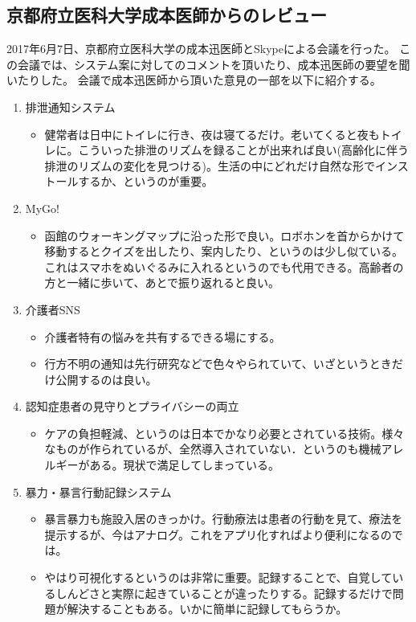 \documentclass[../report]{subfiles}
\begin{document}
\subsection{京都府立医科大学成本医師からのレビュー}
2017年6月7日、京都府立医科大学の成本迅医師とSkypeによる会議を行った。
この会議では、システム案に対してのコメントを頂いたり、成本迅医師の要望を聞いたりした。
会議で成本迅医師から頂いた意見の一部を以下に紹介する。
\begin{enumerate}
    \item 排泄通知システム
        \begin{itemize}
            \item 健常者は日中にトイレに行き、夜は寝てるだけ。老いてくると夜もトイレに。こういった排泄のリズムを録ることが出来れば良い(高齢化に伴う排泄のリズムの変化を見つける)。生活の中にどれだけ自然な形でインストールするか、というのが重要。
        \end{itemize}
    \item MyGo!
        \begin{itemize}
            \item 函館のウォーキングマップに沿った形で良い。ロボホンを首からかけて移動するとクイズを出したり、案内したり、というのは少し似ている。これはスマホをぬいぐるみに入れるというのでも代用できる。高齢者の方と一緒に歩いて、あとで振り返れると良い。
        \end{itemize}
    \item 介護者SNS
        \begin{itemize}
            \item 介護者特有の悩みを共有するできる場にする。
            \item 行方不明の通知は先行研究などで色々やられていて、いざというときだけ公開するのは良い。
        \end{itemize}
    \item 認知症患者の見守りとプライバシーの両立
        \begin{itemize}
            \item ケアの負担軽減、というのは日本でかなり必要とされている技術。様々なものが作られているが、全然導入されていない．というのも機械アレルギーがある。現状で満足してしまっている。
        \end{itemize}
    \item 暴力・暴言行動記録システム
        \begin{itemize}
            \item 暴言暴力も施設入居のきっかけ。行動療法は患者の行動を見て、療法を提示するが、今はアナログ。これをアプリ化すればより便利になるのでは。
            \item やはり可視化するというのは非常に重要。記録することで、自覚しているしんどさと実際に起きていることが違ったりする。記録するだけで問題が解決することもある。いかに簡単に記録してもらうか。
        \end{itemize}
\end{enumerate}
\end{document}

